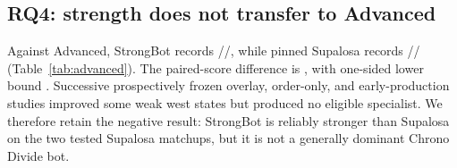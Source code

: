 \subsection{RQ4: strength does not transfer to Advanced}

\begin{table}[t]
\centering
\caption{Paired HFO transfer test against the independently sourced RA2Web
Advanced opponent. These rows use the same 360 country--start--slot cases.}
\label{tab:advanced}
\small

\end{table}

Against Advanced, StrongBot records
\AdvancedStrongWins{}/\AdvancedStrongDraws{}/\AdvancedStrongLosses{}, while
pinned Supalosa records
\AdvancedSupalosaWins{}/\AdvancedSupalosaDraws{}/\AdvancedSupalosaLosses{}
(Table~\ref{tab:advanced}). The paired-score difference is
\AdvancedPairedMean{}, with one-sided lower bound \AdvancedPairedLower{}.
Successive prospectively frozen overlay, order-only, and early-production
studies improved some weak west states but produced no eligible specialist.
We therefore retain the negative result: StrongBot is reliably stronger than
Supalosa on the two tested Supalosa matchups, but it is not a generally
dominant Chrono Divide bot.
